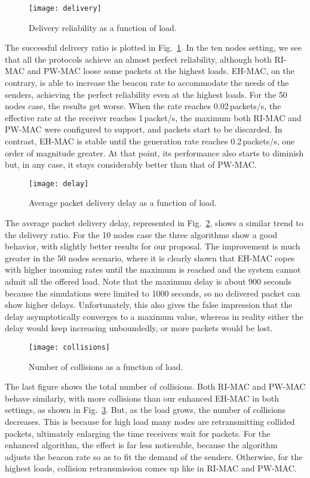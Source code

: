 \documentclass[journal,english,twocolumn,10pt,letterpaper]{IEEEtran}
\begin{document}
\begin{figure}
  \centering
  \texttt{[image: delivery]}
  \caption{Delivery reliability as a function of load.}
  \label{fig:delivery-ratio}
\end{figure}
The successful delivery ratio is plotted in Fig.~\ref{fig:delivery-ratio}. In
the ten nodes setting, we see that all the protocols achieve an almost perfect
reliability, although both RI-MAC and PW-MAC loose some packets at the highest
loads. EH-MAC, on the contrary, is able to increase the beacon rate to
accommodate the needs of the senders, achieving the perfect reliability even
at the highest loads. For the 50 nodes case, the results get worse. When the
rate reaches 0.02$\,$packets$/$s, the effective rate at the receiver reaches
1$\,$packet$/$s, the maximum both RI-MAC and PW-MAC were configured to
support, and packets start to be discarded. In contrast, EH-MAC is stable
until the generation rate reaches 0.2$\,$packets$/$s, one order of magnitude
greater. At that point, its performance also starts to diminish but, in any
case, it stays considerably better than that of PW-MAC.

\begin{figure}
  \centering
  \texttt{[image: delay]}
  \caption{Average packet delivery delay as a function of load.}
  \label{fig:delay}
\end{figure}
The average packet delivery delay, represented in Fig.~\ref{fig:delay}, shows
a similar trend to the delivery ratio. For the 10 nodes case the three
algorithms show a good behavior, with slightly better results for our
proposal. The improvement is much greater in the 50 nodes scenario, where it
is clearly shown that EH-MAC copes with higher incoming rates until the
maximum is reached and the system cannot admit all the offered load. Note that
the maximum delay is about 900 seconds because the simulations were limited to
1000 seconds, so no delivered packet can show higher delays. Unfortunately,
this also gives the false impression that the delay asymptotically converges
to a maximum value, whereas in reality either the delay would keep increasing
unboundedly, or more packets would be lost.

\begin{figure}
  \centering
  \texttt{[image: collisions]}
  \caption{Number of collisions as a function of load.}
  \label{fig:collisions}
\end{figure}
The last figure shows the total number of collisions. Both RI-MAC and PW-MAC
behave similarly, with more collisions than our enhanced EH-MAC in both
settings, as shown in Fig.~\ref{fig:collisions}. But, as the load grows, the
number of collisions decreases. This is because for
high load many nodes are retransmitting collided packets,
ultimately enlarging the time receivers wait for packets. For the enhanced
algorithm, the effect is far less noticeable, because the algorithm adjusts
the beacon rate so as to fit the demand of the senders. Otherwise, for the
highest loads, collision retransmission comes up like in RI-MAC and PW-MAC.
\end{document}
